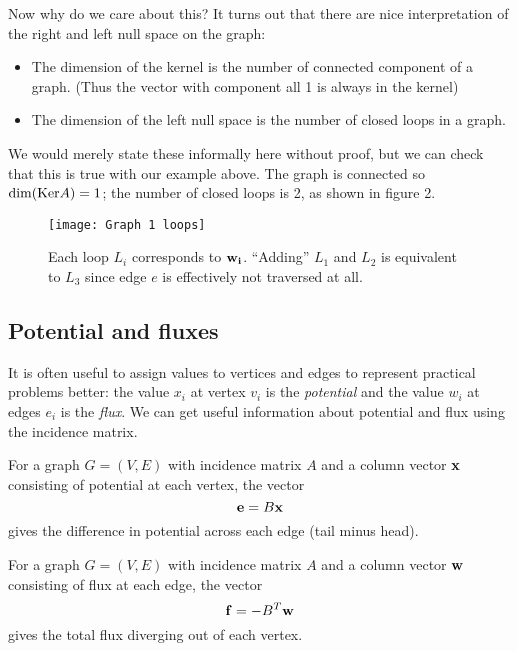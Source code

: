 \documentclass[11pt]{article}
\begin{document}
\vspace{5pt}Now why do we care about this? It turns out that there are nice interpretation of the right and left null space on the graph:
\begin{itemize}
  \item The dimension of the kernel is the number of connected component of a graph. (Thus the vector with component all 1 is always in the kernel)
  \item The dimension of the left null space is the number of closed loops in a graph.
\end{itemize}
We would merely state these informally here without proof, but we can check that this is true with our example above. The graph is connected so \(\dim(\rm{Ker}A)=1\); the number of closed loops is 2, as shown in figure 2.

\begin{figure}[ht]
  \centering
  \texttt{[image: Graph 1 loops]}
  \caption{Each loop \(L_i\) corresponds to \(\bf{w_i}\). ``Adding'' \(L_1\) and \(L_2\) is equivalent
  to \(L_3\) since edge \(e\) is effectively not traversed at all.}
\end{figure}

\subsection{Potential and fluxes}
It is often useful to assign values to vertices and edges to represent practical problems better: the value \(x_i\) at vertex \(v_i\) is the \emph{potential} and the value \(w_i\) at edges \(e_i\) is the \emph{flux}. We can get useful information about potential and flux using the incidence matrix.

\begin{proposition}
  For a graph \(G=(V,E)\) with incidence matrix \(A\) and a column vector \(\bf{x}\) consisting of potential at each vertex, the vector 
  \[\bf{e}=B\bf{x}\]
  gives the difference in potential across each edge (tail minus head).  
\end{proposition}

\begin{proposition}
  For a graph \(G=(V,E)\) with incidence matrix \(A\) and a column vector \(\bf{w}\) consisting of flux at each edge, the vector 
  \[\bf{f}=-B^T\bf{w}\]
  gives the total flux diverging out of each vertex.  
\end{proposition}
\end{document}
